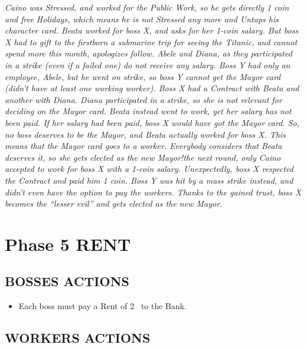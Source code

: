             \textit{Caino was Stressed, and worked for the Public Work, so he gets directly 1 coin and
            free Holidays, which means he is not Stressed any more and Untaps his character
            card. Beata worked for boss X, and asks for her 1-coin salary. But boss X had to gift
            to the firstborn a submarine trip for seeing the Titanic, and cannot spend more this
            month, apologizes follow. Abele and Diana, as they participated in a strike (even
            if a failed one) do not receive any salary. Boss Y had only an employee, Abele, but
            he went on strike, so boss Y cannot get the Mayor card (didn't have at least one
            working worker). Boss X had a Contract with Beata and another with Diana. Diana
            participated in a strike, so she is not relevant for deciding on the Mayor card. Beata
            instead went to work, yet her salary has not been paid. If her salary had been paid,
            boss X would have got the Mayor card. So, no boss deserves to be the Mayor, and
            Beata actually worked for boss X. This means that the Mayor card goes to a worker.
            Everybody considers that Beata deserves it, so she gets elected as the new Mayor!\newline
            [...] the next round, only Caino accepted to work for boss X with a 1-coin salary.
            Unexpectedly, boss X respected the Contract and paid him 1 coin. Boss Y was hit by
            a mass strike instead, and didn't even have the option to pay the workers. Thanks
            to the gained trust, boss X becomes the “lesser evil” and gets elected as the new
            Mayor.}



\section{Phase 5 RENT}

    \subsection{BOSSES ACTIONS}

        \begin{itemize}
            \item Each boss must pay a Rent of 2 \faRubleSign\ to the Bank.
        \end{itemize}
    
    \subsection{WORKERS ACTIONS}

